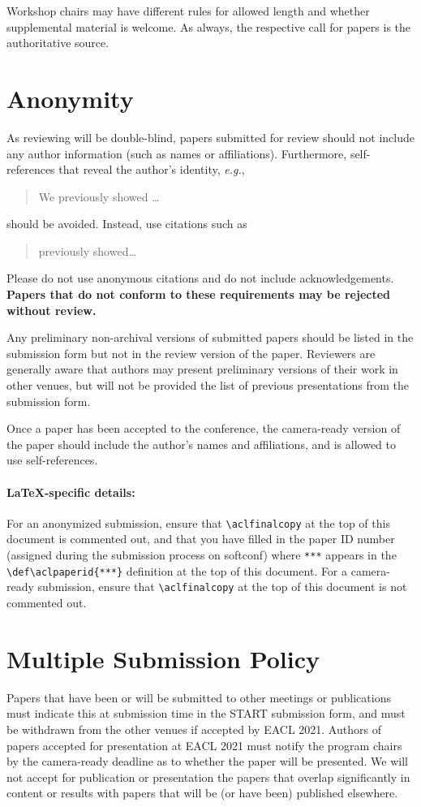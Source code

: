 \documentclass[11pt,a4paper]{article}
\begin{document}
Workshop chairs may have different rules for allowed length and whether supplemental material is welcome.
As always, the respective call for papers is the authoritative source.


\section{Anonymity}
As reviewing will be double-blind, papers submitted for review should not include any author information (such as names or affiliations). Furthermore, self-references that reveal the author's identity, \emph{e.g.},
\begin{quote}
We previously showed \citep{Gusfield:97} \ldots
\end{quote}
should be avoided. Instead, use citations such as 
\begin{quote}
\citet{Gusfield:97} previously showed\ldots
\end{quote}
Please do not use anonymous citations and do not include acknowledgements.
\textbf{Papers that do not conform to these requirements may be rejected without review.}

Any preliminary non-archival versions of submitted papers should be listed in the submission form but not in the review version of the paper.
Reviewers are generally aware that authors may present preliminary versions of their work in other venues, but will not be provided the list of previous presentations from the submission form.

Once a paper has been accepted to the conference, the camera-ready version of the paper should include the author's names and affiliations, and is allowed to use self-references.

\paragraph{\LaTeX-specific details:}
For an anonymized submission, ensure that {\small\verb|\aclfinalcopy|} at the top of this document is commented out, and that you have filled in the paper ID number (assigned during the submission process on softconf) where {\small\verb|***|} appears in the {\small\verb|\def\aclpaperid{***}|} definition at the top of this document.
For a camera-ready submission, ensure that {\small\verb|\aclfinalcopy|} at the top of this document is not commented out.


\section{Multiple Submission Policy}
Papers that have been or will be submitted to other meetings or publications must indicate this at submission time in the START submission form, and must be withdrawn from the other venues if accepted by EACL 2021. Authors of papers accepted for presentation at EACL 2021 must notify the program chairs by the camera-ready deadline as to whether the paper will be presented. We will not accept for publication or presentation the papers that overlap significantly in content or results with papers that will be (or have been) published elsewhere.
\end{document}
